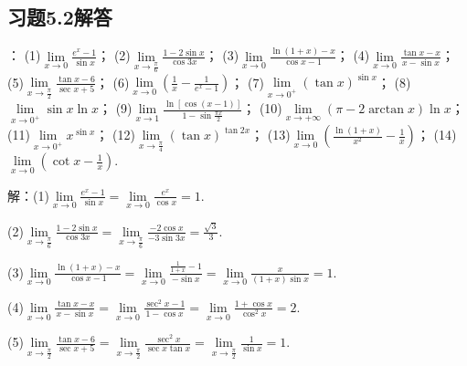 \documentclass[12pt,UTF8]{ctexart}
\begin{document}
\subsection{习题5.2解答}
\begin{enumerate}
：
\newline
(1)$\lim\limits_{x\rightarrow0}\frac{e^x-1}{\sin x}$；
\newline
(2)$\lim\limits_{x\rightarrow\frac\pi6}\frac{1-2\sin x}{\cos3x}$；
\newline
(3)$\lim\limits_{x\rightarrow0}\frac{\ln(1+x)-x}{\cos x-1}$；
\newline
(4)$\lim\limits_{x\rightarrow0}\frac{\tan x-x}{x-\sin x}$；
\newline
(5)$\lim\limits_{x\rightarrow\frac\pi2}\frac{\tan x-6}{\sec x+5}$；
\newline
(6)$\lim\limits_{x\rightarrow0}(\frac1x-\frac1{e^x-1})$；
\newline
(7)$\lim\limits_{x\rightarrow0^+}(\tan x)^{\sin x}$；
\newline
(8)$\lim\limits_{x\rightarrow0^+}\sin x\ln x$；
\newline
(9)$\lim\limits_{x\rightarrow1}\frac{\ln[\cos(x-1)]}{1-\sin\frac{\pi x}2}$；
\newline
(10)$\lim\limits_{x\rightarrow+\infty}(\pi-2\arctan x)\ln x$；
\newline
(11)$\lim\limits_{x\rightarrow0^+}x^{\sin x}$；
\newline
(12)$\lim\limits_{x\rightarrow\frac\pi4}(\tan x)^{\tan2x}$；
\newline
(13)$\lim\limits_{x\rightarrow0}(\frac{\ln(1+x)}{x^2}-\frac1x)$；
\newline
(14)$\lim\limits_{x\rightarrow0}(\cot x-\frac1x)$.

解：(1)$\lim\limits_{x\rightarrow0}\frac{e^x-1}{\sin x}=\lim\limits_{x\rightarrow0}\frac{e^x}{\cos x}=1$.

(2)$\lim\limits_{x\rightarrow\frac\pi6}\frac{1-2\sin x}{\cos3x}=\lim\limits_{x\rightarrow\frac\pi6}\frac{-2\cos x}{-3\sin3x}=\frac{\sqrt3}3$.

(3)$\lim\limits_{x\rightarrow0}\frac{\ln(1+x)-x}{\cos x-1}=\lim\limits_{x\rightarrow0}\frac{\frac1{1+x}-1}{-\sin x}=\lim\limits_{x\rightarrow0}\frac x{(1+x)\sin x}=1$.

(4)$\lim\limits_{x\rightarrow0}\frac{\tan x-x}{x-\sin x}=\lim\limits_{x\rightarrow0}\frac{\sec^2x-1}{1-\cos x}=\lim\limits_{x\rightarrow0}\frac{1+\cos x}{\cos^2x}=2$.

(5)$\lim\limits_{x\rightarrow\frac\pi2}\frac{\tan x-6}{\sec x+5}=\lim\limits_{x\rightarrow\frac\pi2}\frac{\sec^2x}{\sec x\tan x}=\lim\limits_{x\rightarrow\frac\pi2}\frac1{\sin x}=1$.


\end{enumerate}
\end{document}
